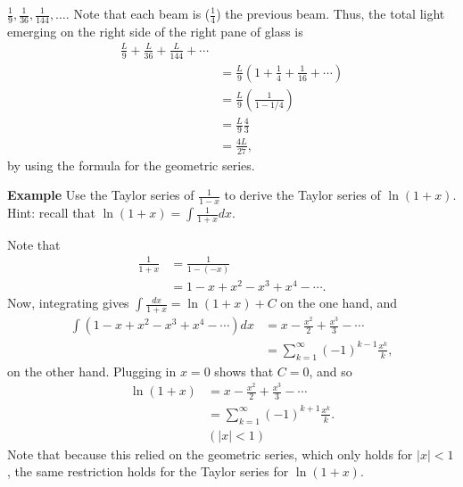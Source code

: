 \documentclass[twoside,openright,titlepage,a4paper]{book}
\begin{document}
\begin{sloppypar}
\begin{examplebox}
$\frac{1}{9},\frac{1}{36},\frac{1}{144},\ldots$. Note that each beam is ($\frac{1}{4}$) the previous beam. Thus, the total light emerging on the right side of the right pane of glass is
\begin{align*} 
\frac{L}{9} + \frac{L}{36} + \frac{L}{144}+\dotsb \\
&= \frac{L}{9} \left(1 + \frac{1}{4}+\frac{1}{16}+\dotsb\right) \\
&= \frac{L}{9} \left(\frac{1}{1-1/4}\right) \\
&= \frac{L}{9} \frac{4}{3} \\
&= \frac{4L}{27}, 
\end{align*}
by using the formula for the geometric series.
\end{examplebox}

\textbf{Example} Use the Taylor series of $\frac{1}{1-x}$ to derive the Taylor series of $\ln(1+x)$. Hint: recall that $\ln(1+x) = \int \frac{1}{1+x}dx$.
\begin{examplebox}
Note that
\begin{align*}
\frac{1}{1+x} &= \frac{1}{1-(-x)} \\
&= 1-x+x^2-x^3+x^4-\dotsb.
\end{align*}
Now, integrating gives $\int \frac{dx}{1+x} = \ln(1+x) + C$ on the one hand, and
\begin{align*}
\int (1-x+x^2-x^3+x^4-\dotsb) dx &= x - \frac{x^2}{2} +\frac{x^3}{3} -\dotsb \\
&= \sum_{k=1}^\infty (-1)^{k-1}\frac{x^k}{k}, 
\end{align*}
on the other hand. Plugging in $x=0$ shows that $C=0$, and so
\begin{align*}
\ln(1+x) &= x - \frac{x^2}{2} +\frac{x^3}{3} -\dotsb \\
&= \sum_{k=1}^\infty (-1)^{k+1}\frac{x^k}{k}. \\
& (|x|<1) 
\end{align*}
Note that because this relied on the geometric series, which only holds for $|x|<1$, the same restriction holds for the Taylor series for $\ln(1+x)$.
\end{examplebox}


\end{sloppypar}
\end{document}
